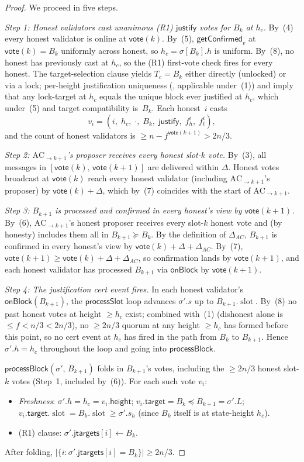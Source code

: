 \documentclass{article}
\newcommand{\slot}[0]{\ensuremath{\operatorname{\mathrm{slot}}}}
\newcommand{\target}{\mathsf{target}}
\newcommand{\height}{\mathsf{height}}
\newcommand{\just}{\ensuremath{\mathsf{justify}}\xspace}
\newcommand{\jtargets}{\mathsf{jtargets}}
\newcommand{\vote}{\mathsf{vote}}
\newcommand{\processSlot}{\textsf{processSlot}\xspace}
\newcommand{\processBlock}{\textsf{processBlock}\xspace}
\newcommand{\onBlock}{\textsf{onBlock}\xspace}
\newcommand{\getConfirmed}{\textsf{getConfirmed}\xspace}
\theoremstyle{plain}
\theoremstyle{definition}
\theoremstyle{remark}
\begin{document}
\begin{proof}
We proceed in five steps.

\emph{Step 1: Honest validators cast unanimous \mbox{(R1)} \just votes for $B_k$ at $h_c$.}
By~(4) every honest validator is online at $\vote(k)$. By~(5), $\getConfirmed_v$ at $\vote(k) = B_k$ uniformly across honest, so $h_c = \sigma[B_k].h$ is uniform. By~(8), no honest has previously cast at $h_c$, so the \mbox{(R1)} first-vote check fires for every honest. The target-selection clause yields $T_c = B_k$ either directly (unlocked) or via a lock; per-height justification uniqueness (, applicable under~(1)) and  imply that any lock-target at $h_c$ equals the unique block ever justified at $h_c$, which under~(5) and target compatibility is~$B_k$. Each honest~$i$ casts
\[
  v_i = (i,\; h_c,\; \cdot,\; B_k,\; \just,\; f_h^i,\; f_t^i),
\]
and the count of honest validators is $\geq n - f^{\vote(k+1)} > 2n/3$.

\emph{Step 2: $\mathrm{AC}_{\to k+1}$'s proposer receives every honest slot-$k$ vote.}
By~(3), all messages in $[\vote(k),\, \vote(k+1)]$ are delivered within $\Delta$. Honest votes broadcast at $\vote(k)$ reach every honest validator (including $\mathrm{AC}_{\to k+1}$'s proposer) by $\vote(k) + \Delta$, which by~(7) coincides with the start of $\mathrm{AC}_{\to k+1}$.

\emph{Step 3: $B_{k+1}$ is processed and confirmed in every honest's view by $\vote(k+1)$.}
By~(6), $\mathrm{AC}_{\to k+1}$'s honest proposer receives every slot-$k$ honest vote and (by honesty) includes them all in $B_{k+1} \succeq B_k$. By the definition of $\Delta_{AC}$, $B_{k+1}$ is confirmed in every honest's view by $\vote(k) + \Delta + \Delta_{AC}$. By~(7), $\vote(k+1) \geq \vote(k) + \Delta + \Delta_{AC}$, so confirmation lands by $\vote(k+1)$, and each honest validator has processed $B_{k+1}$ via $\onBlock$ by $\vote(k+1)$.

\emph{Step 4: The justification cert event fires.}
In each honest validator's $\onBlock(B_{k+1})$, the $\processSlot$ loop advances $\sigma'.s$ up to $B_{k+1}.\slot$. By~(8) no past honest votes at height $\geq h_c$ exist; combined with~(1) (dishonest alone is $\leq f < n/3 < 2n/3$), no $\geq 2n/3$ quorum at any height $\geq h_c$ has formed before this point, so no cert event at $h_c$ has fired in the path from $B_k$ to $B_{k+1}$. Hence $\sigma'.h = h_c$ throughout the loop and going into $\processBlock$.

$\processBlock(\sigma',\, B_{k+1})$ folds in $B_{k+1}$'s votes, including the $\geq 2n/3$ honest slot-$k$ votes (Step~1, included by~(6)). For each such vote $v_i$:
\begin{itemize}
  \item \emph{Freshness}: $\sigma'.h = h_c = v_i.\height$; $v_i.\target = B_k \preceq B_{k+1} = \sigma'.L$; $v_i.\target.\slot = B_k.\slot \geq \sigma'.s_h$ (since $B_k$ itself is at state-height $h_c$).
  \item \mbox{(R1)} clause: $\sigma'.\jtargets[i] \gets B_k$.
\end{itemize}
After folding, $|\{i : \sigma'.\jtargets[i] = B_k\}| \geq 2n/3$.


\end{proof}
\end{document}
